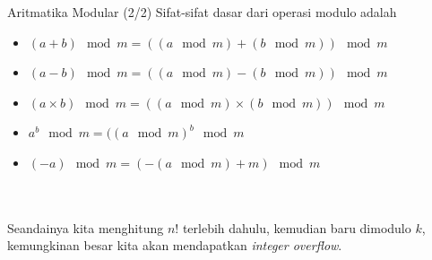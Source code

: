 \documentclass[english,t]{beamer}
\renewcommand{\emph}[1]{\textcolor{navyblue}{#1}}
\begin{document}
\begin{frame}{Aritmatika Modular (2/2)}
	Sifat-sifat dasar dari operasi modulo adalah
	\begin{itemize}   
		\item<2-> $(a+b) \mod m = ((a \mod m) + (b \mod m)) \mod m$
		\item<3-> $(a-b) \mod m = ((a \mod m) - (b \mod m)) \mod m$
		\item<4-> $(a \times b) \mod m = ((a \mod m) \times (b \mod m)) \mod m$
		\item<5-> $a^b \mod m = ((a \mod m)^b \mod m$
		\item<6-> $(-a) \mod m = (-(a \mod m) + m) \mod m$
	\end{itemize}
	
 \\
 \\
 Seandainya kita menghitung $n!$ terlebih dahulu, kemudian baru dimodulo $k$, kemungkinan besar kita akan mendapatkan \textit{integer overflow}.	
\end{frame}

%
%
\end{document}
